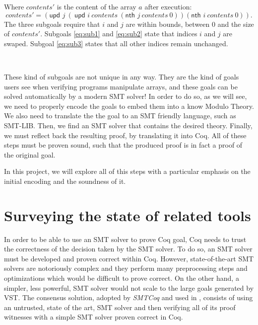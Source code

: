 \documentclass[onecolumn, preprint]{sigplanconf}
\newcommand{\nth}[3]{\textsf{nth } #1\ #2\ #3}
\newcommand{\unth}[3]{\textsf{upd } #1\ #2\ #3}
\begin{document}
Where $contents'$ is the content of the array $a$ after execution:
$$contents' = (\unth j (\unth{i}{contents} (\nth{j}{contents}{0})) (\nth{i}{contents}{0})).$$
The three subgoals require that $i$ and $j$ are within bounds, between 0 and the size of $contents'$. Subgoals \ref{eq:sub1} and \ref{eq:sub2} state that indices $i$ and $j$ are swaped.
Subgoal \ref{eq:sub3} states that all other indices remain unchanged.

\

These kind of subgoals are not unique in any way. They are the kind of goals users see when verifying programs manipulate arrays, and these goals can be solved automatically by a modern SMT solver! In order to do so, as we will see, we need to properly encode the goals to embed them into a know Modulo Theory. We also need to translate the the goal to an SMT friendly language, such as SMT-LIB. Then, we find an SMT solver that contains the desired theory. Finally, we must reflect back the resulting proof, by translating it into Coq. All of these steps must be proven sound, such that the produced proof is in fact a proof of the original goal. %

In this project, we will explore all of this steps with a particular emphasis on the initial encoding and the soundness of it.











\section{Surveying the state of related tools}
\label{sec:survey}


In order to be able to use an SMT solver to prove Coq goal, Coq needs to trust the correctness of the decision taken by the SMT solver. To do so, an SMT solver must be developed and proven correct within Coq. However, state-of-the-art SMT solvers are notoriously complex and they perform many preprocessing steps and optimizations which would be difficult to prove correct. On the other hand, a simpler, less powerful, SMT solver would not scale to the large goals generated by VST. The consensus solution, adopted by \emph{SMTCoq} \citep{keller13} and used in \cite{appelnote}, consists of using an untrusted, state of the art, SMT solver and then verifying all of its proof witnesses with a simple SMT solver proven correct in Coq. 
\end{document}
